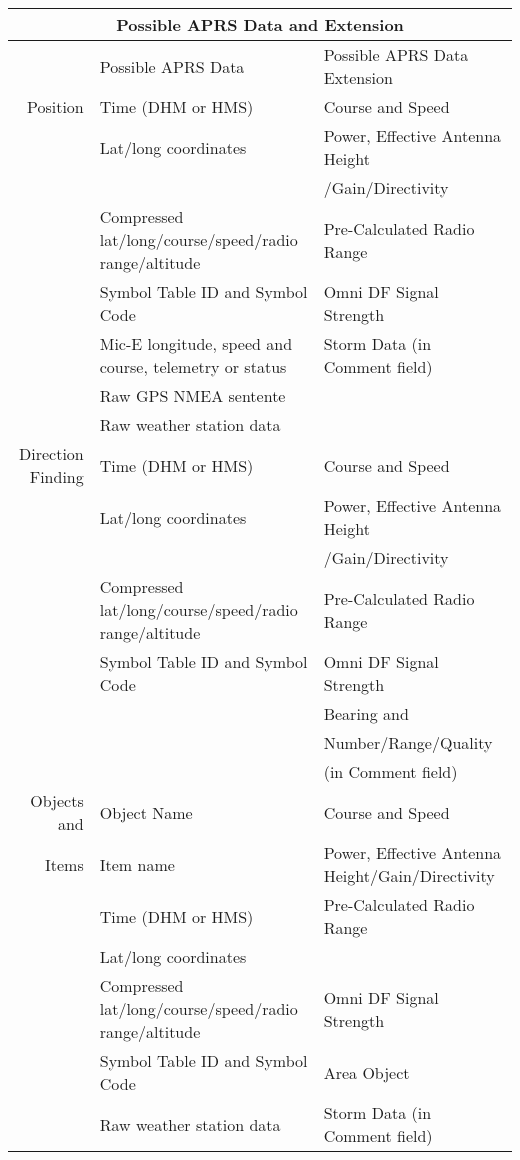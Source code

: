\renewcommand{\arraystretch}{1.1}
  \begin{tabular}{|r|l|l|}
    \hline
    \hline
    \multicolumn{3}{|c|}{Possible APRS Data and Extension} \\
    \hline
    \hline
    \hline
    & Possible APRS Data & Possible APRS Data Extension \\
    \hline

    
    Position & Time (DHM or HMS) & Course and Speed \\
    & Lat/long coordinates & Power, Effective Antenna Height \\
    & & /Gain/Directivity \\
    & Compressed lat/long/course/speed/radio range/altitude & Pre-Calculated Radio Range \\
    & Symbol Table ID and Symbol Code & Omni DF Signal Strength \\
    & Mic-E longitude, speed and course, telemetry or status & Storm Data (in Comment field) \\
    & Raw GPS NMEA sentente & \\
    & Raw weather station data & \\
    \hline
    

    Direction Finding & Time (DHM or HMS) & Course and Speed \\
    & Lat/long coordinates & Power, Effective Antenna Height \\
    & & /Gain/Directivity \\
    & Compressed lat/long/course/speed/radio range/altitude & Pre-Calculated Radio Range \\
    & Symbol Table ID and Symbol Code & Omni DF Signal Strength \\
    & & Bearing and \\
    & & Number/Range/Quality \\
    & & (in Comment field) \\
    \hline

    Objects and & Object Name & Course and Speed \\
    Items & Item name & Power, Effective Antenna Height/Gain/Directivity \\
    & Time  (DHM or HMS) & Pre-Calculated Radio Range \\
    & Lat/long coordinates & \\
    & Compressed lat/long/course/speed/radio range/altitude & Omni DF Signal Strength \\
    & Symbol Table ID and Symbol Code & Area Object \\
    & Raw weather station data & Storm Data (in Comment field) \\
    \hline
    

\end{tabular}
